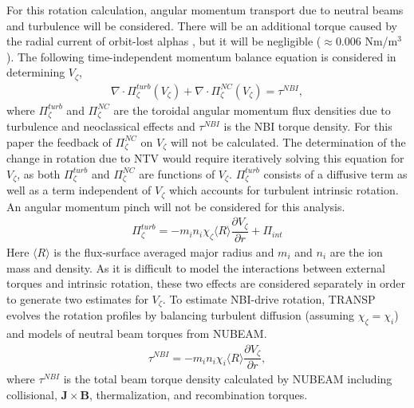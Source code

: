 \documentclass{article}
\newcommand{\partder}[2]{\dfrac{\partial  #1}{\partial  #2}} %
\begin{document}
For this rotation calculation, angular momentum transport due to neutral beams and turbulence will be considered. There will be an additional torque caused by the radial current of orbit-lost alphas \cite{Rosenbluth1996}, but it will be negligible ($\approx 0.006$ Nm/m$^3$). The following time-independent momentum balance equation is considered in determining $V_{\zeta}$,
\begin{gather}
\nabla \cdot \Pi_{\zeta}^{turb}(V_{\zeta}) + \nabla \cdot \Pi_{\zeta}^{NC}(V_{\zeta}) = \tau^{NBI},
\end{gather}
where $\Pi^{turb}_{\zeta}$ and $\Pi^{NC}_{\zeta}$ are the toroidal angular momentum flux densities due to turbulence and neoclassical effects and $\tau^{NBI}$ is the NBI torque density. For this paper the feedback of $\Pi_{\zeta}^{NC}$ on $V_{\zeta}$ will not be calculated. The determination of the change in rotation due to NTV would require iteratively solving this equation for $V_{\zeta}$, as both $\Pi_{\zeta}^{turb}$ and $\Pi_{\zeta}^{NC}$ are functions of $V_{\zeta}$. $\Pi_{\zeta}^{turb}$ consists of a diffusive term as well as a term independent of $V_{\zeta}$ which accounts for turbulent intrinsic rotation. An angular momentum pinch will not be considered for this analysis. 
\begin{gather}
\Pi_{\zeta}^{turb} = -m_i n_i \chi_{\zeta} \langle R \rangle\partder{V_{\zeta}}{r} + \Pi_{int}
\end{gather}
Here $\langle R \rangle$ is the flux-surface averaged major radius and $m_i$ and $n_i$ are the ion mass and density. As it is difficult to model the interactions between external torques and intrinsic rotation, these two effects are considered separately in order to generate two estimates for $V_{\zeta}$. To estimate NBI-drive rotation, TRANSP evolves the rotation profiles by balancing turbulent diffusion (assuming $\chi_{\zeta} = \chi_{i}$) and models of neutral beam torques from NUBEAM. 
\begin{gather}
\tau^{NBI} = -m_i n_i \chi_{i} \langle R \rangle \partder{V_{\zeta}}{r},
\end{gather}
where $\tau^{NBI}$ is the total beam torque density calculated by NUBEAM including collisional, $\bm{J} \times \bm{B}$, thermalization, and recombination torques.
\end{document}
